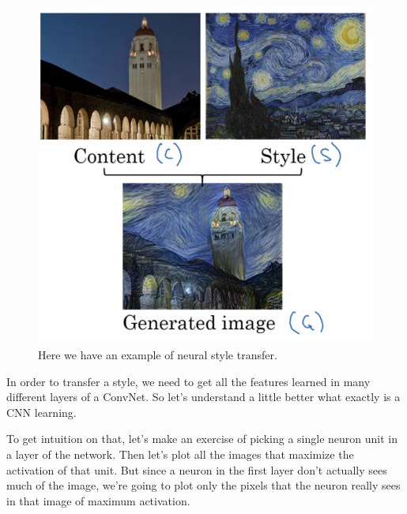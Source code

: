 \documentclass[12pt, a4paper, oneside]{book}
\begin{document}
\begin{figure}[h]
\centering
\includegraphics[scale=0.5]{Res/neural_style_transfer.png}
\caption{Here we have an example of neural style transfer.}
\label{neural_style_transfer.png}
\end{figure}

In order to transfer a style, we need to get all the features learned in many
different layers of a ConvNet. So let's understand a little better what exactly
is a CNN learning.

To get intuition on that, let's make an exercise of picking a single neuron unit
in a layer of the network. Then let's plot all the images that maximize the
activation of that unit. But since a neuron in the first layer don't actually
sees much of the image, we're going to plot only the pixels that the neuron
really sees in that image of maximum activation.
\end{document}
